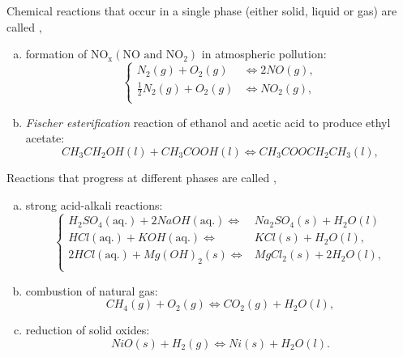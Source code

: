 \medskip
Chemical reactions that occur in a single phase (either solid, liquid or gas) are called , \eg{}
\begin{enumerate}[a)]
  \item formation of NO$_{\text{x}} \left(\text{NO and NO}_{2}\right)$ in atmospheric pollution:
    \begin{displaymath}
      \begin{cases}
         N_{2} (g) + O_{2} (g) &\Longleftrightarrow 2 NO (g),  \\
         \frac{1}{2} N_{2} (g) + O_{2} (g) &\Longleftrightarrow NO_{2} (g),  \\
      \end{cases}
    \end{displaymath}
 \item {\it Fischer esterification} reaction of ethanol and acetic acid to produce ethyl acetate:
        \begin{displaymath}
           CH_{3}CH_{2}OH (l) + CH_{3}COOH (l) \Longleftrightarrow CH_{3}COOCH_{2}CH_{3} (l),
        \end{displaymath}
\end{enumerate}

Reactions that progress at different phases are called , \eg
\begin{enumerate}[a)]
    \item strong acid-alkali reactions:
    \begin{displaymath}
      \begin{cases}
           H_{2}SO_{4} (\text{aq.}) + 2 NaOH (\text{aq.}) \Longleftrightarrow&  Na_{2}SO_{4} (s) + H_{2}O (l) \\
           HCl (\text{aq.}) + KOH (\text{aq.}) \Longleftrightarrow& KCl (s) + H_{2}O (l),  \\
           2 HCl (\text{aq.}) + Mg(OH)_{2} (s)  \Longleftrightarrow& MgCl_{2} (s) + 2 H_{2}O (l), \\
      \end{cases}
    \end{displaymath}
    \item combustion of natural gas:
        \begin{displaymath}
           CH_{4} (g) + O_{2} (g) \Longleftrightarrow CO_{2} (g) + H_{2}O (l),
        \end{displaymath}
    \item reduction of solid oxides:
        \begin{displaymath}
           NiO (s) + H_{2} (g) \Longleftrightarrow Ni (s) + H_{2}O (l). 
        \end{displaymath}        
\end{enumerate}

